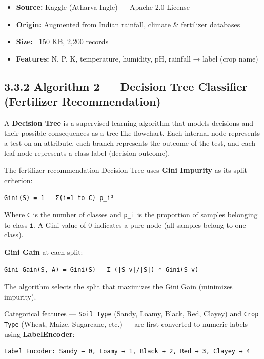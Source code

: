 \documentclass[12pt,a4paper]{report}
\begin{document}
\begin{itemize}
\item \textbf{Source:} Kaggle (Atharva Ingle) — Apache 2.0 License
\item \textbf{Origin:} Augmented from Indian rainfall, climate \& fertilizer databases
\item \textbf{Size:} ~150 KB, 2,200 records
\item \textbf{Features:} N, P, K, temperature, humidity, pH, rainfall → label (crop name)
\end{itemize}
\newpage

\subsection{3.3.2 Algorithm 2 — Decision Tree Classifier (Fertilizer Recommendation)}


A \textbf{Decision Tree} is a supervised learning algorithm that models decisions and their possible consequences as a tree-like flowchart. Each internal node represents a test on an attribute, each branch represents the outcome of the test, and each leaf node represents a class label (decision outcome).


The fertilizer recommendation Decision Tree uses \textbf{Gini Impurity} as its split criterion:

\begin{verbatim}
Gini(S) = 1 - Σ(i=1 to C) p_i²
\end{verbatim}

Where \texttt{C} is the number of classes and \texttt{p\_i} is the proportion of samples belonging to class \texttt{i}. A Gini value of 0 indicates a pure node (all samples belong to one class).

\textbf{Gini Gain} at each split:

\begin{verbatim}
Gini Gain(S, A) = Gini(S) - Σ (|S_v|/|S|) * Gini(S_v)
\end{verbatim}

The algorithm selects the split that maximizes the Gini Gain (minimizes impurity).


Categorical features — \texttt{Soil Type} (Sandy, Loamy, Black, Red, Clayey) and \texttt{Crop Type} (Wheat, Maize, Sugarcane, etc.) — are first converted to numeric labels using \textbf{LabelEncoder}:

\begin{verbatim}
Label Encoder: Sandy → 0, Loamy → 1, Black → 2, Red → 3, Clayey → 4
\end{verbatim}
\end{document}
